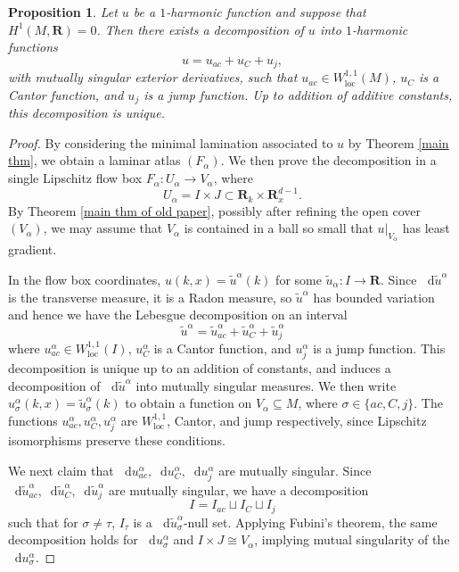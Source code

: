 \documentclass[reqno,11pt]{amsart}
\newcommand{\RR}{\mathbf{R}}
\newcommand*\dif{\mathop{}\!\mathrm{d}}
\newcommand{\loc}{\mathrm{loc}}
\newtheorem{proposition}[theorem]{Proposition}
\theoremstyle{definition}
\numberwithin{equation}{section}
\begin{document}
\begin{proposition}
Let $u$ be a $1$-harmonic function and suppose that $H^1(M, \RR) = 0$. Then there exists a decomposition of $u$ into $1$-harmonic functions 
$$u = u_{ac} + u_C + u_j,$$
with mutually singular exterior derivatives, such that $u_{ac} \in W^{1, 1}_\loc(M)$, $u_C$ is a Cantor function, and $u_j$ is a jump function.
Up to addition of additive constants, this decomposition is unique.
\end{proposition}
\begin{proof}
By considering the minimal lamination associated to $u$ by Theorem \ref{main thm}, we obtain a laminar atlas $(F_\alpha)$.
We then prove the decomposition in a single Lipschitz flow box $F_\alpha: U_\alpha \to V_\alpha$, where
$$U_\alpha = I \times J \subset \RR_k \times \RR^{d - 1}_x.$$
By Theorem \ref{main thm of old paper}, possibly after refining the open cover $(V_\alpha)$, we may assume that $V_\alpha$ is contained in a ball so small that $u|_{V_\alpha}$ has least gradient.

In the flow box coordinates, $u(k, x) = \tilde u^\alpha(k)$ for some $\tilde u_\alpha: I \to \RR$. 
Since $\dif \tilde u^\alpha$ is the transverse measure, it is a Radon measure, so $\tilde u^\alpha$ has bounded variation and hence we have the Lebesgue decomposition on an interval \cite[Corollary 3.33]{Ambrosio2000FunctionsOB} 
$$\tilde u^\alpha = \tilde u^\alpha_{ac} + \tilde u^\alpha_C + \tilde u^\alpha_j$$
where $u^\alpha_{ac} \in W^{1, 1}_\loc(I)$, $u^\alpha_C$ is a Cantor function, and $u_j^\alpha$ is a jump function.
This decomposition is unique up to an addition of constants, and induces a decomposition of $\dif \tilde u^\alpha$ into mutually singular measures.
We then write $u^\alpha_\sigma(k, x) = \tilde u^\alpha_\sigma(k)$ to obtain a function on $V_\alpha \subseteq M$, where $\sigma \in \{ac, C, j\}$.
The functions $u^\alpha_{ac}, u^\alpha_C, u^\alpha_j$ are $W^{1,1}_\loc$, Cantor, and jump respectively, since Lipschitz isomorphisms preserve these conditions.

We next claim that $\dif u^\alpha_{ac}, \dif u^\alpha_C, \dif u^\alpha_j$ are mutually singular.
Since $\dif \tilde u^\alpha_{ac}, \dif \tilde u^\alpha_C, \dif \tilde u^\alpha_j$ are mutually singular, we have a decomposition
$$I = I_{ac} \sqcup I_C \sqcup I_j$$
such that for $\sigma \neq \tau$, $I_\tau$ is a $\dif \tilde u^\alpha_\sigma$-null set.
Applying Fubini's theorem, the same decomposition holds for $\dif u^\alpha_\sigma$ and $I \times J \cong V_\alpha$, implying mutual singularity of the $\dif u^\alpha_\sigma$.


\end{proof}
\end{document}
